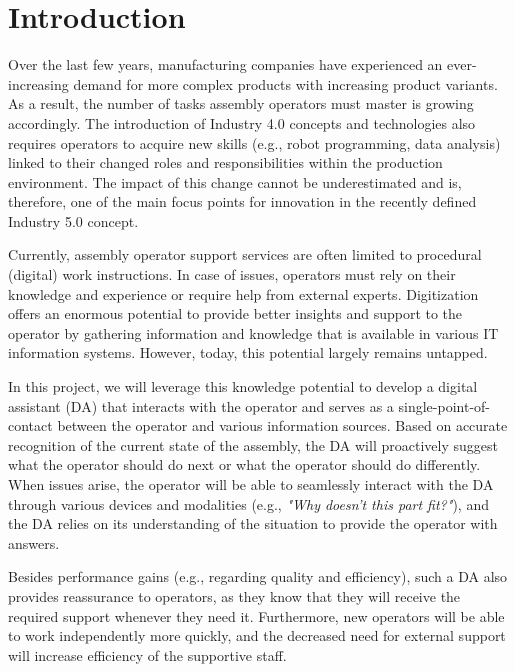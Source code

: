 \section{Introduction}\label{sec:Introduction}

Over the last few years, manufacturing companies have experienced an ever-increasing demand for more complex products with increasing product variants. As a result, the number of tasks assembly operators must master is growing accordingly. The introduction of Industry 4.0 concepts and technologies also requires operators to acquire new skills (e.g., robot programming, data analysis) linked to their changed roles and responsibilities within the production environment. The impact of this change cannot be underestimated and is, therefore, one of the main focus points for innovation in the recently defined Industry 5.0 concept. 

Currently, assembly operator support services are often limited to procedural (digital) work instructions. In case of issues, operators must rely on their knowledge and experience or require help from external experts. Digitization offers an enormous potential to provide better insights and support to the operator by gathering information and knowledge that is available in various IT information systems. However, today, this potential largely remains untapped. 

In this project, we will leverage this knowledge potential to develop a digital assistant (DA) that interacts with the operator and serves as a single-point-of-contact between the operator and various information sources. Based on accurate recognition of the current state of the assembly, the DA will proactively suggest what the operator should do next or what the operator should do differently. When issues arise, the operator will be able to seamlessly interact with the DA through various devices and modalities (e.g., \textit{"Why doesn't this part fit?"}), and the DA relies on its understanding of the situation to provide the operator with answers. 

Besides performance gains (e.g., regarding quality and efficiency), such a DA also provides reassurance to operators, as they know that they will receive the required support whenever they need it. Furthermore, new operators will be able to work independently more quickly, and the decreased need for external support will increase efficiency of the supportive staff.
